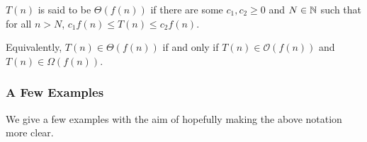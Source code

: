 \begin{definition}
$T(n)$ is said to be $\Theta(f(n))$ if there are some $c_1,c_2\geq 0$ and $N\in\mathbb{N}$ such that for all $n>N$, $c_1 f(n) \leq T(n)\leq c_2 f(n)$.\\
\end{definition}

Equivalently, $T(n) \in \Theta(f(n))$ if and only if $T(n) \in \mathcal{O}(f(n))$ and $T(n) \in \Omega(f(n))$.

\subsubsection{A Few Examples}

We give a few examples with the aim of hopefully making the above notation more clear.

